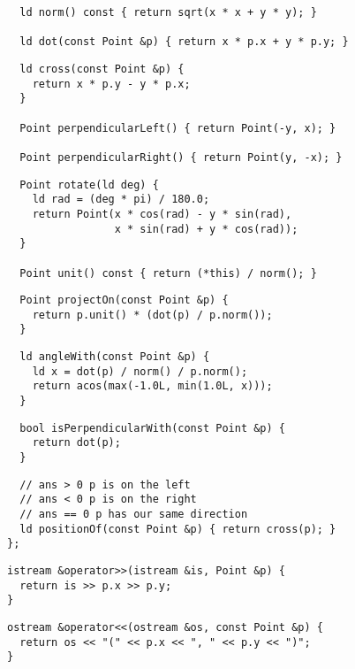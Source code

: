 \documentclass[twoside]{article}
\begin{document}
\begin{multicols*}{2}
\begin{verbatim}
  ld norm() const { return sqrt(x * x + y * y); }

  ld dot(const Point &p) { return x * p.x + y * p.y; }
\end{verbatim}
\vspace{-12pt}
\begin{verbatim}
  ld cross(const Point &p) {
    return x * p.y - y * p.x;
  }

  Point perpendicularLeft() { return Point(-y, x); }

  Point perpendicularRight() { return Point(y, -x); }
\end{verbatim}
\vspace{-12pt}
\begin{verbatim}
  Point rotate(ld deg) {
    ld rad = (deg * pi) / 180.0;
    return Point(x * cos(rad) - y * sin(rad),
                 x * sin(rad) + y * cos(rad));
  }

  Point unit() const { return (*this) / norm(); }
\end{verbatim}
\vspace{-12pt}
\begin{verbatim}
  Point projectOn(const Point &p) {
    return p.unit() * (dot(p) / p.norm());
  }
\end{verbatim}
\vspace{-12pt}
\begin{verbatim}
  ld angleWith(const Point &p) {
    ld x = dot(p) / norm() / p.norm();
    return acos(max(-1.0L, min(1.0L, x)));
  }
\end{verbatim}
\vspace{-12pt}
\begin{verbatim}
  bool isPerpendicularWith(const Point &p) {
    return dot(p);
  }
\end{verbatim}
\vspace{-12pt}
\begin{verbatim}
  // ans > 0 p is on the left
  // ans < 0 p is on the right
  // ans == 0 p has our same direction
  ld positionOf(const Point &p) { return cross(p); }
};
\end{verbatim}
\vspace{-12pt}
\begin{verbatim}
istream &operator>>(istream &is, Point &p) {
  return is >> p.x >> p.y;
}
\end{verbatim}
\vspace{-12pt}
\begin{verbatim}
ostream &operator<<(ostream &os, const Point &p) {
  return os << "(" << p.x << ", " << p.y << ")";
}
\end{verbatim}


\end{multicols*}
\end{document}
